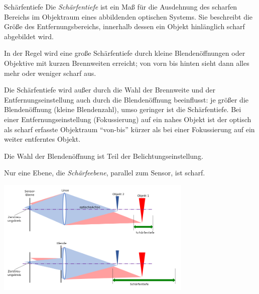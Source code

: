 \begin{defi}{Schärfentiefe}
    Die \emph{Schärfentiefe} ist ein Maß für die Ausdehnung des scharfen Bereichs im Objektraum eines abbildenden optischen Systems.
    Sie beschreibt die Größe des Entfernungsbereichs, innerhalb dessen ein Objekt hinlänglich scharf abgebildet wird.

    In der Regel wird eine große Schärfentiefe durch kleine Blendenöffnungen oder Objektive mit kurzen Brennweiten erreicht;
    von vorn bis hinten sieht dann alles mehr oder weniger scharf aus.

    Die Schärfentiefe wird außer durch die Wahl der Brennweite und der Entfernungseinstellung auch durch die Blendenöffnung beeinflusst:
    je größer die Blendenöffnung (kleine Blendenzahl), umso geringer ist die Schärfentiefe.
    Bei einer Entfernungseinstellung (Fokussierung) auf ein nahes Objekt ist der optisch als scharf erfasste Objektraum \enquote{von-bis} kürzer als bei einer Fokussierung auf ein weiter entferntes Objekt.

    Die Wahl der Blendenöffnung ist Teil der Belichtungseinstellung.

    Nur eine Ebene, die \emph{Schärfeebene}, parallel zum Sensor, ist scharf.

    \centering
    \includegraphics[width=0.7\textwidth]{figures/schaerfentiefe.png}
\end{defi}

